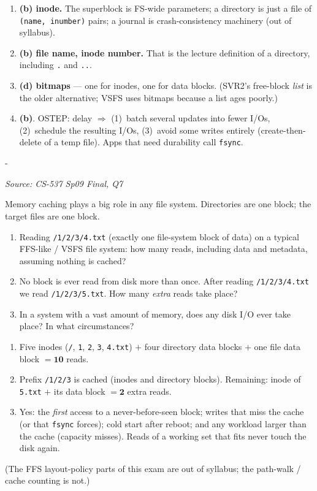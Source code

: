 \documentclass[11pt,a4paper]{article}
\makeatletter
\newcommand{\keepspace}[1]{\par\penalty-100\begingroup
  \setlength{\dimen@}{#1}\dimen@ii\pagegoal\advance\dimen@ii-\pagetotal
  \ifdim\dimen@>\dimen@ii\ifdim\dimen@ii>\z@\vfil\fi\break\fi\endgroup}
\newcounter{qn}[section]
\newenvironment{Qn}[4]{%
  \refstepcounter{qn}\keepspace{7\baselineskip}%
  \begin{tcolorbox}[qboxstyle, title={Q\thesection.\theqn\ \ [#1 \textbar\ #2]\ \ #4}]%
  {\footnotesize\color{g3}\textit{Source: #3}}\par\smallskip%
}{%
  \end{tcolorbox}%
}
\newenvironment{Sol}{%
  \begin{tcolorbox}[sboxstyle, title={Solution}]%
}{%
  \end{tcolorbox}\vspace{0.35em}%
}
\makeatother
\begin{document}
\begin{Sol}
\begin{enumerate}[(31)]
\item \textbf{(b) inode.} The superblock is FS-wide parameters; a
      directory is just a file of \texttt{(name, inumber)} pairs; a
      journal is crash-consistency machinery (out of syllabus).
\item \textbf{(b) file name, inode number.} That is the lecture
      definition of a directory, including \texttt{.} and \texttt{..}.
\item \textbf{(d) bitmaps} --- one for inodes, one for data blocks.
      (SVR2's free-block \emph{list} is the older alternative; VSFS
      uses bitmaps because a list ages poorly.)
\item \textbf{(b)}. OSTEP: delay $\Rightarrow$ (1)~batch several
      updates into fewer I/Os, (2)~schedule the resulting I/Os,
      (3)~avoid some writes entirely (create-then-delete of a temp
      file). Apps that need durability call \texttt{fsync}.
\end{enumerate}
\end{Sol}

\begin{Qn}{Medium}{Lect 23--24}{CS-537 Sp09 Final, Q7}{How many reads to open \texttt{/1/2/3/4.txt}, then a sibling?}
Memory caching plays a big role in any file system. Directories are one
block; the target files are one block.
\begin{enumerate}[1.]
\item Reading \texttt{/1/2/3/4.txt} (exactly one file-system block of
      data) on a typical FFS-like / VSFS file system: how many reads,
      including data and metadata, assuming nothing is cached?
\item No block is ever read from disk more than once. After reading
      \texttt{/1/2/3/4.txt} we read \texttt{/1/2/3/5.txt}. How many
      \emph{extra} reads take place?
\item In a system with a vast amount of memory, does any disk I/O
      ever take place? In what circumstances?
\end{enumerate}
\end{Qn}
\begin{Sol}
\begin{enumerate}[1.]
\item Five inodes (\texttt{/}, \texttt{1}, \texttt{2}, \texttt{3},
      \texttt{4.txt}) $+$ four directory data blocks $+$ one file
      data block $= \mathbf{10}$ reads.
\item Prefix \texttt{/1/2/3} is cached (inodes and directory blocks).
      Remaining: inode of \texttt{5.txt} $+$ its data block
      $= \mathbf{2}$ extra reads.
\item Yes: the \emph{first} access to a never-before-seen block;
      writes that miss the cache (or that \texttt{fsync} forces);
      cold start after reboot; and any workload larger than the
      cache (capacity misses). Reads of a working set that fits
      never touch the disk again.
\end{enumerate}
(The FFS layout-policy parts of this exam are out of syllabus; the
path-walk / cache counting is not.)
\end{Sol}
\end{document}
